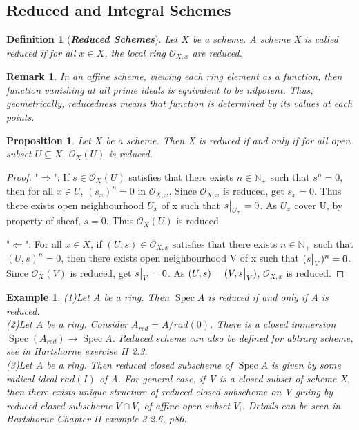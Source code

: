 \documentclass{ctexart}
\newtheorem{definition}{Definition}[section]
\newtheorem{remark}{Remark}[section]
\newtheorem{proposition}{Proposition}[section]
\newtheorem{example}{Example}[section]
\newcommand{\spec}{\operatorname{Spec}}
\begin{document}
\subsection{Reduced and Integral Schemes}
\begin{definition}[\textbf{\emph{Reduced Schemes}}]
    Let $X$ be a scheme.
    A scheme X is called reduced if for all $x\in X$, the local ring $\mathcal{O}_{X, x}$ are reduced.
\end{definition}
\begin{remark}
    In an affine scheme, viewing each ring element as a function, then function vanishing at all prime ideals is equivalent to be nilpotent.
    Thus, geometrically, reducedness means that function is determined by its values at each points.
\end{remark}
\begin{proposition}
    Let $X$ be a scheme.
    Then X is reduced if and only if for all open subset $U \subseteq X$, $\mathcal{O}_{X}(U)$ is reduced.
    \label{Proposition 3.6}
\end{proposition}
\begin{proof}
    "$\Rightarrow$": If $s\in \mathcal{O}_{X}(U)$ satisfies that there exists $n\in \mathbb{N}_{+}$ such that $s^{n} = 0$,
    then for all $x\in U$, $(s_{x})^{n} = 0$ in $\mathcal{O}_{X, x}$.
    Since $\mathcal{O}_{X, x}$ is reduced, get $s_{x} = 0$.
    Thus there exists open neighbourhood $U_{x}$ of x such that $s\big{|}_{U_{x}} = 0$.
    As $U_{x}$ cover U, by property of sheaf, $s = 0$.
    Thus $\mathcal{O}_{X}(U)$ is reduced.
    \par
    "$\Leftarrow$": For all $x\in X$, if $(U, s)\in \mathcal{O}_{X, x}$ satisfies that there exists $n\in \mathbb{N}_{+}$ such that $(U, s)^{n} = 0$,
    then there exists open neighbourhood V of x such that $(s\big{|}_{V})^{n} = 0$.
    Since $\mathcal{O}_{X}(V)$ is reduced, get $s\big{|}_{V} = 0$.
    As $(U, s) = (V, s\big{|}_{V})$, $\mathcal{O}_{X, x}$ is reduced.
\end{proof}
\begin{example}
    (1)Let $A$ be a ring.
    Then $\spec A$ is reduced if and only if A is reduced. \\
    (2)Let $A$ be a ring.
    Consider $A_{red} = A/rad(0)$.
    There is a closed immersion $\spec(A_{red}) \longrightarrow \spec A$.
    Reduced scheme can also be defined for abtrary scheme, see in Hartshorne exercise II 2.3. \\
    (3)Let $A$ be a ring.
    Then reduced closed subscheme of $\spec A$ is given by some radical ideal $rad(I)$ of A.
    For general case, if V is a closed subset of scheme X, then there exists unique structure of reduced closed subscheme on V gluing by reduced closed subscheme $V \cap V_{i}$ of affine open subset $V_{i}$.
    Details can be seen in Hartshorne Chapter II example 3.2.6, p86.
\end{example}
\end{document}
